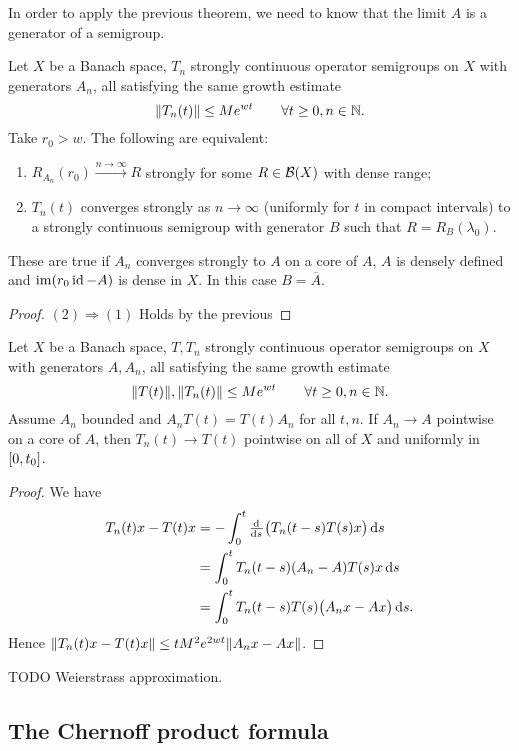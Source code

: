 In order to apply the previous theorem, we need to know that the limit $A$ is a generator of a semigroup.

\begin{theorem} \label{secondTrotterKato}
Let $X$ be a Banach space, $T_n$ strongly continuous operator semigroups on $X$ with generators $A_n$, all satisfying the same growth estimate
\[ \lVert T_n(t)\rVert \leq Me^{wt} \qquad \forall t\geq 0, n\in \mathbb{N}. \]
Take $r_0 > w$. The following are equivalent:
\begin{enumerate}
\item $R_{A_n}(r_0) \overset{n\to\infty}{\longrightarrow} R$ strongly for some $R\in\operatorname{\mathcal{B}}(X)$ with dense range;
\item $T_n(t)$ converges strongly as $n\to\infty$ (uniformly for $t$ in compact intervals) to a strongly continuous semigroup with generator $B$ such that $R= R_B(\lambda_0)$.
\end{enumerate}
These are true if $A_n$ converges strongly to $A$ on a core of $A$, $A$ is densely defined and $\operatorname{im}(r_0\operatorname{id} - A)$ is dense in $X$. In this case $B = \overline{A}$.
\end{theorem}
\begin{proof}
$(2) \Rightarrow (1)$ Holds by the previous
\end{proof}

\begin{lemma}
Let $X$ be a Banach space, $T, T_n$ strongly continuous operator semigroups on $X$ with generators $A, A_n$, all satisfying the same growth estimate
\[ \lVert T(t)\rVert, \lVert T_n(t)\rVert \leq Me^{wt} \qquad \forall t\geq 0, n\in \mathbb{N}. \]
Assume $A_n$ bounded and $A_nT(t) = T(t)A_n$ for all $t,n$. If $A_n\to A$ pointwise on a core of $A$, then $T_n(t)\to T(t)$ pointwise on all of $X$ and uniformly in $\interval{0,t_0}$.
\end{lemma}
\begin{proof}
We have
\begin{align}
T_n(t)x - T(t)x &= -\int_0^t\od{}{s}\big(T_n(t-s)T(s)x\big)\diff{s} \\
&= \int_0^tT_n(t-s)(A_n-A)T(s)x\diff{s} \\
&= \int_0^tT_n(t-s)T(s)\big(A_nx - Ax\big)\diff{s}.
\end{align}
Hence $\lVert T_n(t)x - T(t)x\rVert \leq tM^2e^{2wt}\lVert A_nx - Ax\rVert$.
\end{proof}

TODO Weierstrass approximation.

\subsection{The Chernoff product formula}

